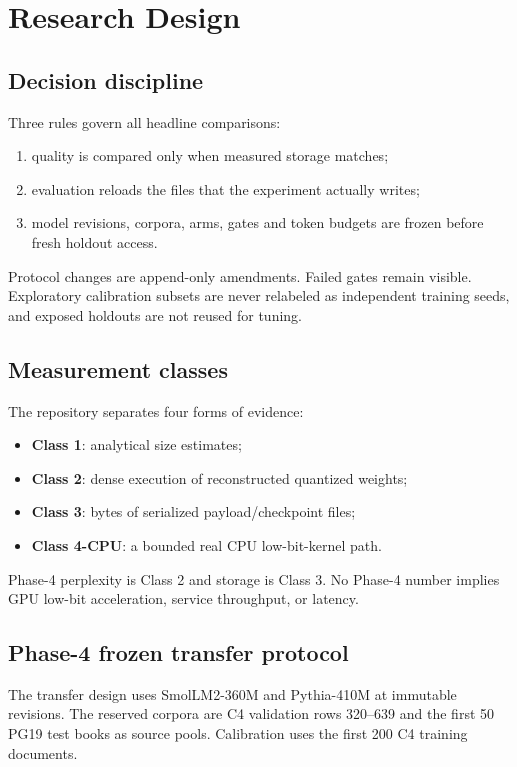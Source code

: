 \documentclass[10pt,twocolumn]{article}
\begin{document}
\section{Research Design}

\subsection{Decision discipline}

Three rules govern all headline comparisons:
\begin{enumerate}
  \item quality is compared only when measured storage matches;
  \item evaluation reloads the files that the experiment actually writes;
  \item model revisions, corpora, arms, gates and token budgets are frozen before
  fresh holdout access.
\end{enumerate}

Protocol changes are append-only amendments. Failed gates remain visible.
Exploratory calibration subsets are never relabeled as independent training
seeds, and exposed holdouts are not reused for tuning.

\subsection{Measurement classes}

The repository separates four forms of evidence:
\begin{itemize}
  \item \textbf{Class 1}: analytical size estimates;
  \item \textbf{Class 2}: dense execution of reconstructed quantized weights;
  \item \textbf{Class 3}: bytes of serialized payload/checkpoint files;
  \item \textbf{Class 4-CPU}: a bounded real CPU low-bit-kernel path.
\end{itemize}

Phase-4 perplexity is Class 2 and storage is Class 3. No Phase-4 number implies
GPU low-bit acceleration, service throughput, or latency.

\subsection{Phase-4 frozen transfer protocol}

The transfer design uses SmolLM2-360M and Pythia-410M at immutable revisions.
The reserved corpora are C4 validation rows 320--639 and the first 50 PG19 test
books as source pools. Calibration uses the first 200 C4 training documents.
\end{document}
